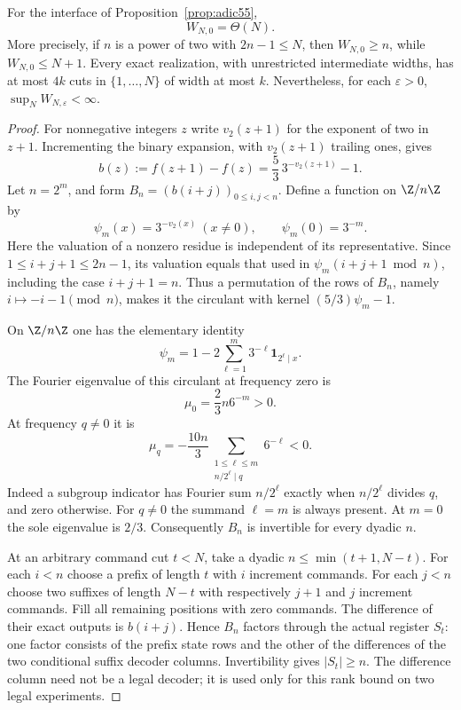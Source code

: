 \begin{theorem}\label{thm:adiclinear55}
For the interface of Proposition~\ref{prop:adic55},
\[
                         W_{N,0}=\Theta(N).
\]
More precisely, if $n$ is a power of two with $2n-1\le N$, then $W_{N,0}\ge n$, while $W_{N,0}\le N+1$. Every exact realization, with unrestricted intermediate widths, has at most $4k$ cuts in $\{1,\ldots,N\}$ of width at most $k$. Nevertheless, for each $\varepsilon>0$, $\sup_NW_{N,\varepsilon}<\infty$.
\end{theorem}
\begin{proof}
For nonnegative integers $z$ write $v_2(z+1)$ for the exponent of two in $z+1$. Incrementing the binary expansion, with $v_2(z+1)$ trailing ones, gives
\begin{equation}\label{eq:adicdifference55}
 b(z):=f(z+1)-f(z)=\frac53\,3^{-v_2(z+1)}-1.
\end{equation}
Let $n=2^m$, and form $B_n=(b(i+j))_{0\le i,j<n}$. Define a function on $\Z/n\Z$ by
\[
 \psi_m(x)=3^{-v_2(x)}\ (x\ne0),\qquad \psi_m(0)=3^{-m}.
\]
Here the valuation of a nonzero residue is independent of its representative. Since $1\le i+j+1\le2n-1$, its valuation equals that used in $\psi_m(i+j+1\bmod n)$, including the case $i+j+1=n$. Thus a permutation of the rows of $B_n$, namely $i\mapsto-i-1\pmod n$, makes it the circulant with kernel $(5/3)\psi_m-1$.

On $\Z/n\Z$ one has the elementary identity
\[
            \psi_m=1-2\sum_{\ell=1}^m3^{-\ell}
                               \mathbf1_{2^\ell\mid x}.
\]
The Fourier eigenvalue of this circulant at frequency zero is
\[
 \mu_0=\frac23 n6^{-m}>0.
\]
At frequency $q\ne0$ it is
\[
 \mu_q=-\frac{10n}{3}
           \sum_{\substack{1\le\ell\le m\\ n/2^\ell\mid q}}6^{-\ell}<0.
\]
Indeed a subgroup indicator has Fourier sum $n/2^\ell$ exactly when $n/2^\ell$ divides $q$, and zero otherwise. For $q\ne0$ the summand $\ell=m$ is always present. At $m=0$ the sole eigenvalue is $2/3$. Consequently $B_n$ is invertible for every dyadic $n$.

At an arbitrary command cut $t<N$, take a dyadic $n\le\min(t+1,N-t)$. For each $i<n$ choose a prefix of length $t$ with $i$ increment commands. For each $j<n$ choose two suffixes of length $N-t$ with respectively $j+1$ and $j$ increment commands. Fill all remaining positions with zero commands. The difference of their exact outputs is $b(i+j)$. Hence $B_n$ factors through the actual register $S_t$: one factor consists of the prefix state rows and the other of the differences of the two conditional suffix decoder columns. Invertibility gives $|S_t|\ge n$. The difference column need not be a legal decoder; it is used only for this rank bound on two legal experiments.


\end{proof}
